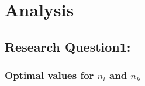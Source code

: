 \documentclass[a4paper, 11pt]{article}
\begin{document}







\pagebreak
\section{Analysis}

\subsection{Research Question1:}

\subsubsection{Optimal values for $n_l$ and $n_k$}
\end{document}
